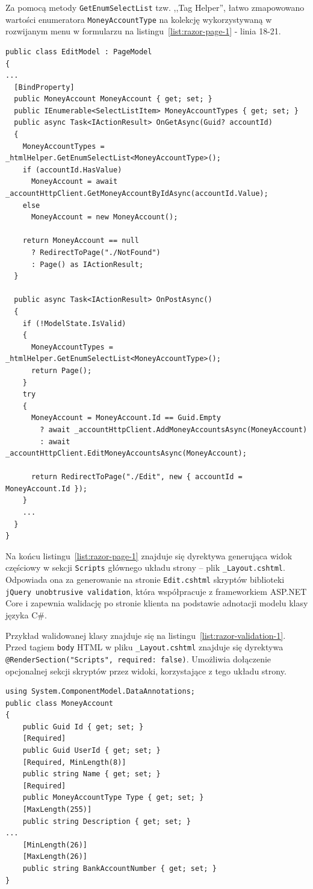 Za pomocą metody \texttt{GetEnumSelectList} tzw. ,,Tag Helper'', łatwo zmapowowano wartości enumeratora \texttt{MoneyAccountType} na kolekcję wykorzystywaną w rozwijanym menu w formularzu na listingu~\ref{list:razor-page-1} - linia 18-21.

{\belowcaptionskip=-10pt
\begin{lstlisting}[label=list:razor-page-model-1,
    caption=Przykład modelu strony Razor Page: \texttt{EditPage.cs}]
public class EditModel : PageModel
{
...
  [BindProperty]
  public MoneyAccount MoneyAccount { get; set; }
  public IEnumerable<SelectListItem> MoneyAccountTypes { get; set; }
  public async Task<IActionResult> OnGetAsync(Guid? accountId)
  {
    MoneyAccountTypes = _htmlHelper.GetEnumSelectList<MoneyAccountType>();
    if (accountId.HasValue)
      MoneyAccount = await _accountHttpClient.GetMoneyAccountByIdAsync(accountId.Value);
    else
      MoneyAccount = new MoneyAccount();
    
    return MoneyAccount == null 
      ? RedirectToPage("./NotFound")
      : Page() as IActionResult;
  }

  public async Task<IActionResult> OnPostAsync()
  {
    if (!ModelState.IsValid)
    {
      MoneyAccountTypes = _htmlHelper.GetEnumSelectList<MoneyAccountType>();
      return Page();
    }
    try
    {
      MoneyAccount = MoneyAccount.Id == Guid.Empty 
        ? await _accountHttpClient.AddMoneyAccountsAsync(MoneyAccount)
        : await _accountHttpClient.EditMoneyAccountsAsync(MoneyAccount);

      return RedirectToPage("./Edit", new { accountId = MoneyAccount.Id });
    }
    ...
  }
}
\end{lstlisting}
}

Na końcu listingu~\ref{list:razor-page-1} znajduje się dyrektywa generująca widok częściowy w sekcji \texttt{Scripts} głównego układu strony -- plik \texttt{\_Layout.cshtml}. Odpowiada ona za generowanie na stronie \texttt{Edit.cshtml} skryptów biblioteki \texttt{jQuery unobtrusive validation}, która współpracuje z frameworkiem ASP.NET Core i zapewnia walidację po stronie klienta na podstawie adnotacji modelu klasy języka C\#. 

Przykład walidowanej klasy znajduje się na listingu~\ref{list:razor-validation-1}. Przed tagiem \texttt{body} HTML w pliku \texttt{\_Layout.cshtml} znajduje się dyrektywa \texttt{@RenderSection("{}Scripts", required: false)}. Umożliwia dołączenie opcjonalnej sekcji skryptów przez widoki, korzystające z tego układu strony.


{\belowcaptionskip=-10pt
\begin{lstlisting}[label=list:razor-validation-1,
    caption=Przykład klasy z adnotacjami]
using System.ComponentModel.DataAnnotations;
public class MoneyAccount
{
    public Guid Id { get; set; }
    [Required]
    public Guid UserId { get; set; }
    [Required, MinLength(8)]
    public string Name { get; set; }
    [Required]
    public MoneyAccountType Type { get; set; }
    [MaxLength(255)]
    public string Description { get; set; }
...
    [MinLength(26)]
    [MaxLength(26)]
    public string BankAccountNumber { get; set; }
}
\end{lstlisting}
}
